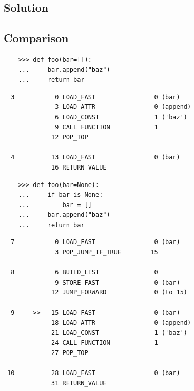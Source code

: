 \documentclass{beamer}
\begin{document}
\subsection{Solution}
\begin{frame}

\pause 
\end{frame}

\subsection{Comparison}
\begin{frame}[fragile]
\begin{lstlisting}
    >>> def foo(bar=[]):
    ...     bar.append("baz")
    ...     return bar
\end{lstlisting}
\begin{lstlisting}
  3           0 LOAD_FAST                0 (bar)
              3 LOAD_ATTR                0 (append)
              6 LOAD_CONST               1 ('baz')
              9 CALL_FUNCTION            1
             12 POP_TOP

  4          13 LOAD_FAST                0 (bar)
             16 RETURN_VALUE

\end{lstlisting}
\end{frame}
\begin{frame}[fragile]
\begin{lstlisting}
    >>> def foo(bar=None):
    ...     if bar is None:
    ...         bar = []
    ...     bar.append("baz")
    ...     return bar
\end{lstlisting}
\begin{lstlisting}
  7           0 LOAD_FAST                0 (bar)
              3 POP_JUMP_IF_TRUE        15

  8           6 BUILD_LIST               0
              9 STORE_FAST               0 (bar)
             12 JUMP_FORWARD             0 (to 15)

  9     >>   15 LOAD_FAST                0 (bar)
             18 LOAD_ATTR                0 (append)
             21 LOAD_CONST               1 ('baz')
             24 CALL_FUNCTION            1
             27 POP_TOP

 10          28 LOAD_FAST                0 (bar)
             31 RETURN_VALUE

\end{lstlisting}
\end{frame}
\end{document}
